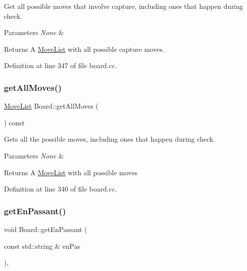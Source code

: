 Get all possible moves that involve capture, including ones that happen during check. 


\begin{DoxyParams}{Parameters}
{\em None} & \\
\hline
\end{DoxyParams}
\begin{DoxyReturn}{Returns}
A \mbox{\hyperlink{classMoveList}{Move\+List}} with all possible capture moves. 
\end{DoxyReturn}


Definition at line 347 of file board.\+cc.

\mbox{\label{classBoard_a515095fc28f6aa8057296914156b09cb}} 
\subsubsection{\texorpdfstring{get\+All\+Moves()}{getAllMoves()}}
{\footnotesize\ttfamily \mbox{\hyperlink{classMoveList}{Move\+List}} Board\+::get\+All\+Moves (\begin{DoxyParamCaption}{ }\end{DoxyParamCaption}) const\hspace{0.3cm}{\ttfamily [noexcept]}}



Gets all the possible moves, including ones that happen during check. 


\begin{DoxyParams}{Parameters}
{\em None} & \\
\hline
\end{DoxyParams}
\begin{DoxyReturn}{Returns}
A \mbox{\hyperlink{classMoveList}{Move\+List}} with all possible moves 
\end{DoxyReturn}


Definition at line 340 of file board.\+cc.

\mbox{\label{classBoard_a9e6c964048b76b8f93c583383efe80ac}} 
\subsubsection{\texorpdfstring{get\+En\+Passant()}{getEnPassant()}}
{\footnotesize\ttfamily void Board\+::get\+En\+Passant (\begin{DoxyParamCaption}\item[{const std\+::string \&}]{en\+Pas }\end{DoxyParamCaption})\hspace{0.3cm}{\ttfamily [private]}, {\ttfamily [noexcept]}}



